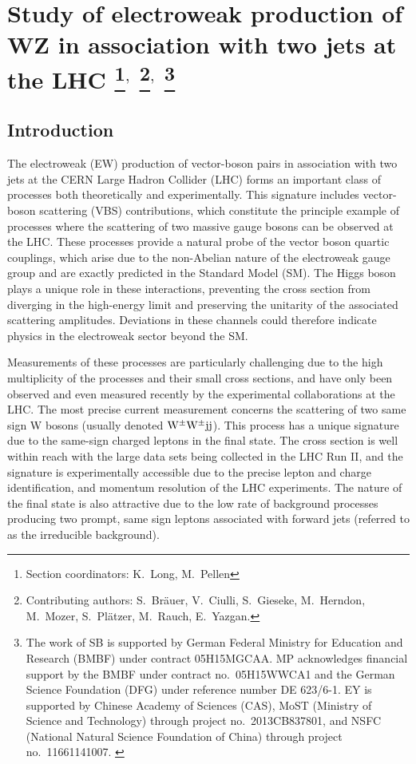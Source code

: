 \documentclass[11pt]{cernrep}
\begin{document}
\section{Study of electroweak production of WZ in association with two jets at the LHC 
\protect\footnote{Section coordinators: K.~Long, M.~Pellen}$^{,}$ 
\protect\footnote{Contributing authors: S.~Br\"auer, V.~Ciulli, S.~Gieseke, M.~Herndon, M.~Mozer, S.~Pl{\"a}tzer, M.~Rauch, E.~Yazgan.}$^{,}$
\protect\footnote{The work of SB is supported by German Federal Ministry for Education and Research (BMBF) under contract 05H15MGCAA.
MP acknowledges financial support by the BMBF under contract no.~05H15WWCA1 and the German Science Foundation (DFG) under reference number DE 623/6-1. 
EY is supported by Chinese Academy of Sciences (CAS), MoST (Ministry of Science and Technology) through project no.~2013CB837801, and NSFC (National Natural Science Foundation of China) through project no.~11661141007. 
\label{vbs_section}}}

\subsection{Introduction \label{vbs_intro}}

The electroweak (EW) production of vector-boson pairs in association with two jets at the CERN Large Hadron Collider (LHC) forms an important class of processes both theoretically and experimentally.
This signature includes vector-boson scattering (VBS) contributions, which constitute the principle example of processes where the scattering of two massive gauge bosons can be observed at the LHC.
These processes provide a natural probe of the vector boson quartic couplings, which arise due to the non-Abelian nature of the electroweak gauge group and are exactly predicted in the Standard Model (SM).
The Higgs boson plays a unique role in these interactions, preventing the cross section from diverging in the high-energy limit and preserving the unitarity of the associated scattering amplitudes.
Deviations in these channels could therefore indicate physics in the electroweak sector beyond the SM.

Measurements of these processes are particularly challenging due to the high multiplicity of the processes and their small cross sections, and 
have only been observed and even measured recently by the experimental collaborations at the LHC.
The most precise current measurement \cite{Aad:2014zda,Khachatryan:2014sta,Sirunyan:2017ret,Aaboud:2016ffv} concerns the scattering of two same sign W bosons (usually denoted ${\rm W}^\pm{\rm W}^\pm{\rm j}{\rm j}$).
This process has a unique signature due to the same-sign charged leptons in the final state.
The cross section is well within reach with the large data sets being collected in the LHC Run II, and the
signature is experimentally accessible due to the precise lepton and charge identification, and momentum resolution of the LHC experiments.
The nature of the final state is also attractive due to the low rate of background processes
producing two prompt, same sign leptons associated with forward jets (referred to as the irreducible background).
\end{document}
